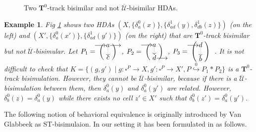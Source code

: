 \documentclass[11pt,a4paper,oldfontcommands]{memoir}
\makeatletter
\newcommand{\TrO}{\mathbf{T}}
\newcommand*\pobj[1]{\square^{#1}}
\newcommand\pomsetwop[4]{%
  \vcenter{\xymatrix@1@R=#1@C=#2@M=#3{#4}}%
}
\newcommand\pomset[2][1.3]{%
  \left(%
    \pomsetwop{0ex}{#1em}{2pt}{#2}%
  \right)%
}
\newcommand\ipomset[2][1.5]{%
  \hspace*{.6em}%
  \left(%
    \hspace*{-#1em}%
    \pomsetwop{2.7ex}{#1em}{1pt}{#2}%
    \hspace*{-#1em}%
  \right)%
  \hspace*{.6em}%
}
\newtheorem{example}[definition]{Example}
\makeatother
\begin{document}
\begin{figure}
\begin{tikzpicture}[x=1.5cm, y=1.5cm]
      
  \end{tikzpicture}
   \smallskip
  \caption{Two $\TrO^0$-track bisimilar and not $\overline{\mathcal{U}}$-bisimilar HDAs.}
  \label{fig: counterexample }
\end{figure}

\begin{example}
   
 Fig \ref{fig: counterexample } shows two HDAs $(X,\{\delta_a^0(x)\},\{\delta^1_{ad}(y), \delta^1_{db}(z)\} )$ (on the left) and $(X',\{\delta_a^0(x')\},\{\delta^1_{ad}(y')\} )$ (on the right) that are $\TrO^0$-track bisimilar but not $\overline{\mathcal{U}}$-bisimular.  Let $P_1=\!\!\ipomset{\ar[r] & a  \ar@{.>}[d]  \ar[r]& 
      \\ & c  &}$, $P_2=\!\!\ipomset{\ar[r]  & a \ar@{.>}[d]
      \\ & d \ar[r] &}$, $P_3=\!\!\ipomset{ \ar[r] &  d \ar@{.>}[d]
      \\ & b &}$.
      It is not difficult to check that $K=\{(g,g')\mid g:\pobj{P} \to X,g':\pobj{P} \to X', P \stackrel{0}{\hookrightarrow} P_1*P_2  \}$ is a $\TrO^0$-track bisimulation. However, they cannot be $\overline{\mathcal{U}}$-bisimilar, because if there is a $\overline{\mathcal{U}}$-bisimulation between them, then $\delta^0_a(y)$ and $\delta^0_a(y')$ are related. However, $\delta_b^0(z)=\delta^0_a(y)$ while there exists no cell $z' \in X'$ such that $\delta_b^0(z')=\delta^0_a(y')$.  %
\end{example}
The following notion of behavioral equivalence is originally introduced by Van Glabbeek \cite{VANGLABBEEK2006265} as ST-bisimulaion. In our setting it has been formulated in \cite{VANGLABBEEK2006265} as follows.
\end{document}
